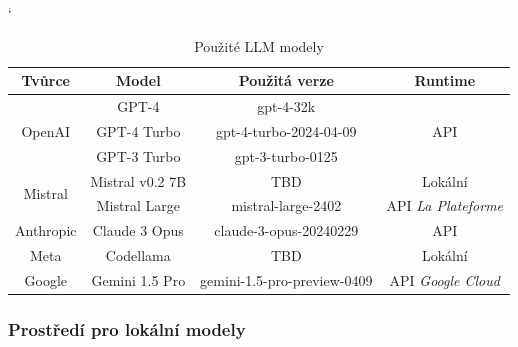 \documentclass[czech, ma, kiv, he, iso690alph, pdf, viewonly]{fasthesis}
\begin{document}
            \begin{table}
                \catcode`
                \begin{tabular}{|c|c|c|c|}
                    \hline
                    \textbf{Tvůrce} & \textbf{Model} & \textbf{Použitá verze} & \textbf{Runtime} \\
                    \hline
                    \multirow{3}{*}{OpenAI} & GPT-4 & gpt-4-32k & \multirow{3}{*}{API} \\
                    \cline{2-3} 
                    & GPT-4 Turbo & gpt-4-turbo-2024-04-09 &  \\
                    \cline{2-3} 
                    & GPT-3 Turbo & gpt-3-turbo-0125 &  \\
                    \hline
                    \multirow{2}{*}{Mistral} & Mistral v0.2 7B & TBD & Lokální \\
                    \cline{2-4} 
                     & Mistral Large & mistral-large-2402 & API \textit{La Plateforme} \\
                    \hline
                    Anthropic & Claude 3 Opus & claude-3-opus-20240229 & API \\
                    \hline
                    Meta & Codellama & TBD & Lokální \\
                    \hline
                    Google & Gemini 1.5 Pro & gemini-1.5-pro-preview-0409 & API \textit{Google Cloud} \\
                    \hline
                \end{tabular}
                \centering
                \caption{Použité LLM modely}
                \label{tab:used_models}
            \end{table}

            \subsubsection{Prostředí pro lokální modely} \label{sec:local_env}
\end{document}

